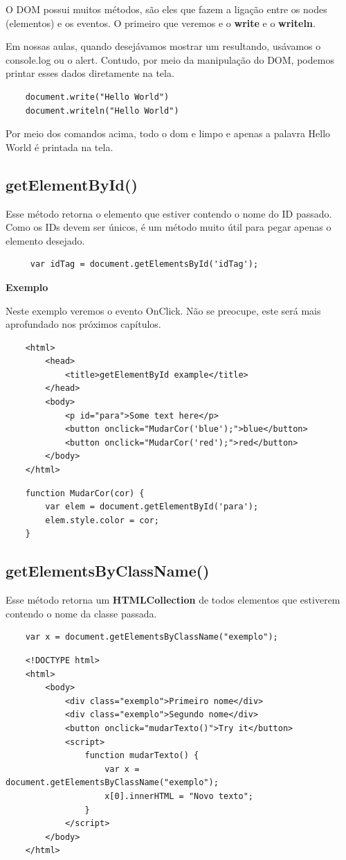 O DOM possui muitos métodos, são eles que fazem a ligação entre os nodes (elementos) e os eventos. O primeiro que veremos e o \textbf{write} e o \textbf{writeln}. 

Em nossas aulas, quando desejávamos mostrar um resultando, usávamos o console.log ou o alert. Contudo, por meio da manipulação do DOM, podemos printar esses dados diretamente na tela.

\begin{lstlisting}
	document.write("Hello World")
	document.writeln("Hello World")
\end{lstlisting}

Por meio dos comandos acima, todo o dom e limpo e apenas a palavra Hello World é printada na tela. 

\subsection{getElementById()}

Esse método retorna o elemento que estiver contendo o nome do ID passado. Como os IDs devem ser únicos, é um método muito útil para pegar apenas o elemento desejado.

\begin{lstlisting}
	 var idTag = document.getElementsById('idTag');
\end{lstlisting}

\textbf{Exemplo}

Neste exemplo veremos o evento OnClick. Não se preocupe, este será mais aprofundado nos próximos capítulos.

\begin{lstlisting}
	<html>
		<head>
			<title>getElementById example</title>
		</head>
		<body>
			<p id="para">Some text here</p>
			<button onclick="MudarCor('blue');">blue</button>
			<button onclick="MudarCor('red');">red</button>
		</body>
	</html>
\end{lstlisting}

\begin{lstlisting}
	function MudarCor(cor) {
		var elem = document.getElementById('para');
		elem.style.color = cor;
	}
\end{lstlisting}

\subsection{getElementsByClassName()}
	
Esse método retorna um \textbf{HTMLCollection} de todos elementos que estiverem contendo o nome da classe passada.

\begin{lstlisting}
	var x = document.getElementsByClassName("exemplo");
\end{lstlisting}

\begin{lstlisting}
	<!DOCTYPE html>
	<html>
		<body>
			<div class="exemplo">Primeiro nome</div>
			<div class="exemplo">Segundo nome</div>
			<button onclick="mudarTexto()">Try it</button>
			<script>
				function mudarTexto() {
					var x = document.getElementsByClassName("exemplo");
					x[0].innerHTML = "Novo texto";
				}
			</script>
		</body>
	</html>	
\end{lstlisting}